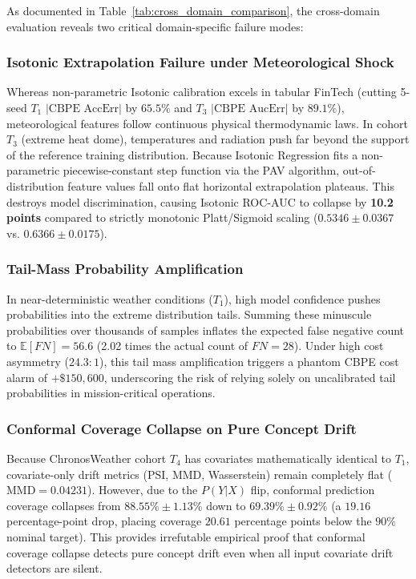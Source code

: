 \documentclass[conference]{IEEEtran}
\begin{document}
As documented in Table~\ref{tab:cross_domain_comparison}, the cross-domain evaluation reveals two critical domain-specific failure modes:

\subsubsection{Isotonic Extrapolation Failure under Meteorological Shock}
Whereas non-parametric Isotonic calibration excels in tabular FinTech (cutting 5-seed $T_1$ $|\text{CBPE AccErr}|$ by $65.5\%$ and $T_3$ $|\text{CBPE AucErr}|$ by $89.1\%$), meteorological features follow continuous physical thermodynamic laws. In cohort $T_3$ (extreme heat dome), temperatures and radiation push far beyond the support of the reference training distribution. Because Isotonic Regression fits a non-parametric piecewise-constant step function via the PAV algorithm, out-of-distribution feature values fall onto flat horizontal extrapolation plateaus. This destroys model discrimination, causing Isotonic ROC-AUC to collapse by \textbf{10.2 points} compared to strictly monotonic Platt/Sigmoid scaling ($0.5346 \pm 0.0367$ vs. $0.6366 \pm 0.0175$).

\subsubsection{Tail-Mass Probability Amplification}
In near-deterministic weather conditions ($T_1$), high model confidence pushes probabilities into the extreme distribution tails. Summing these minuscule probabilities over thousands of samples inflates the expected false negative count to $\mathbb{E}[FN] = 56.6$ (2.02 times the actual count of $FN = 28$). Under high cost asymmetry ($24.3:1$), this tail mass amplification triggers a phantom CBPE cost alarm of $+\$150,600$, underscoring the risk of relying solely on uncalibrated tail probabilities in mission-critical operations.

\subsubsection{Conformal Coverage Collapse on Pure Concept Drift}
Because ChronosWeather cohort $T_4$ has covariates mathematically identical to $T_1$, covariate-only drift metrics (PSI, MMD, Wasserstein) remain completely flat ($\text{MMD} = 0.04231$). However, due to the $P(Y|X)$ flip, conformal prediction coverage collapses from $88.55\% \pm 1.13\%$ down to \textbf{$69.39\% \pm 0.92\%$} (a $19.16$ percentage-point drop, placing coverage $20.61$ percentage points below the $90\%$ nominal target). This provides irrefutable empirical proof that conformal coverage collapse detects pure concept drift even when all input covariate drift detectors are silent.
\end{document}
